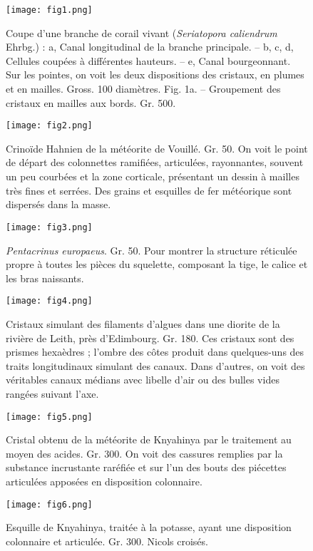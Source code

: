 \documentclass[a4paper, 12pt, oneside, french]{book}
\begin{document}
\clearpage
{}
\begin{figure}[b]
\texttt{[image: fig1.png]}
\caption{Coupe d'une branche de corail vivant (\emph{Seriatopora caliendrum} Ehrbg.) : a, Canal longitudinal de la branche principale. – b, c, d, Cellules coupées à différentes hauteurs. – e, Canal bourgeonnant. Sur les pointes, on voit les deux dispositions des cristaux, en plumes et en mailles. Gross. 100 diamètres. Fig. 1a. – Groupement des cristaux en mailles aux bords. Gr. 500.}
\centering
\end{figure}
\begin{figure}[b]
\texttt{[image: fig2.png]}
\caption{Crinoïde Hahnien de la météorite de Vouillé. Gr. 50. On voit le point de départ des colonnettes ramifiées, articulées, rayonnantes, souvent un peu courbées et la zone corticale, présentant un dessin à mailles très fines et serrées. Des grains et esquilles de fer météorique sont dispersés dans la masse.}
\centering
\end{figure}
\begin{figure}[b]
\texttt{[image: fig3.png]}
\caption{\emph{Pentacrinus europaeus}. Gr. 50. Pour montrer la structure réticulée propre à toutes les pièces du squelette, composant la tige, le calice et les bras naissants.}
\centering
\end{figure}
\begin{figure}[b]
\texttt{[image: fig4.png]}
\caption{Cristaux simulant des filaments d'algues dans une diorite de la rivière de Leith, près d'Edimbourg. Gr. 180. Ces cristaux sont des prismes hexaèdres ; l'ombre des côtes produit dans quelques-uns des traits longitudinaux simulant des canaux. Dans d'autres, on voit des véritables canaux médians avec libelle d'air ou des bulles vides rangées suivant l'axe.}
\centering
\end{figure}
\begin{figure}[b]
\texttt{[image: fig5.png]}
\caption{Cristal obtenu de la météorite de Knyahinya par le traitement au moyen des acides. Gr. 300. On voit des cassures remplies par la substance incrustante raréfiée et sur l'un des bouts des piécettes articulées apposées en disposition colonnaire.}
\centering
\end{figure}
\begin{figure}[b]
\texttt{[image: fig6.png]}
\caption{Esquille de Knyahinya, traitée à la potasse, ayant une disposition colonnaire et articulée. Gr. 300. Nicols croisés.}
\centering
\end{figure}
\end{document}
